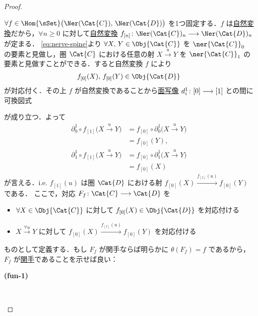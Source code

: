 \documentclass[TQFT_main]{subfiles}
\begin{document}
\begin{proof}
\begin{description}
        $\forall f \in \Hom{\sSet} \bigl( \Ner (\Cat{C}),\, \Ner (\Cat{D}) \bigr)$ を1つ固定する．$f$ は\hyperref[def:nat]{自然変換}だから，$\forall n \ge 0$ に対して\hyperref[def:nat]{自然変換} $f_{[n]} \colon \Ner (\Cat{C})_n \lto \Ner (\Cat{D})_n$ が定まる．
        \eqref{eq:nerve-spine}より $\forall X,\, Y \in \Obj{\Cat{C}}$ を $\ner{\Cat{C}}_0$ の要素と見做し，圏 $\Cat{C}$ における任意の射 $X \xrightarrow{u} Y$ を $\ner{\Cat{C}}_1$ の要素と見做すことができる．すると自然変換 $f$ により
        \begin{align}
            f_{[0]} (X),\, f_{[0]} (Y) \in \Obj{\Cat{D}}
        \end{align}
        が対応付く．その上 $f$ が自然変換であることから\hyperref[def:simplex-cat]{面写像} $d_i^1 \colon [0] \longrightarrow [1]$ との間に可換図式
        \begin{center}
        \end{center}
        が成り立つ．よって
        \begin{align}
            \partial_0^1 \circ f_{[1]}\bigl( X \xrightarrow{u} Y \bigr) 
            &= f_{[0]} \circ \partial_0^1 \bigl( X \xrightarrow{u} Y \bigr)  \\
            &= f_{[0]} (Y), \\
            \partial_1^1 \circ f_{[1]}\bigl( X \xrightarrow{u} Y \bigr) 
            &= f_{[0]} \circ \partial_1^1 \bigl( X \xrightarrow{u} Y \bigr) \\
            &= f_{[0]} (X)
        \end{align}
        が言える．i.e. $f_{[1]}(u)$ は圏 $\Cat{D}$ における射 $f_{[0]}(X) \xrightarrow{f_{[1]}(u)} f_{[0]} (Y)$ である．
        ここで，対応 $F_f \colon \Cat{C} \lto \Cat{D}$ を
        \begin{itemize}
            \item $\forall X \in \Obj{\Cat{C}}$ に対して $f_{[0]}(X) \in \Obj{\Cat{D}}$ を対応付ける
            \item $X \xrightarrow{\forall u} Y$ に対して $f_{[0]}(X) \xrightarrow{f_{[1]}(u)} f_{[0]}(Y)$ を対応付ける
        \end{itemize}
        ものとして定義する．もし $F_f$ が関手ならば明らかに $\theta(F_f) = f$ であるから，$F_f$ が\hyperref[def:functor]{関手}であることを示せば良い：
        \begin{description}
            \item[\textbf{(fun-1)}]　
            

\end{description}
\end{description}
\end{proof}
\end{document}
